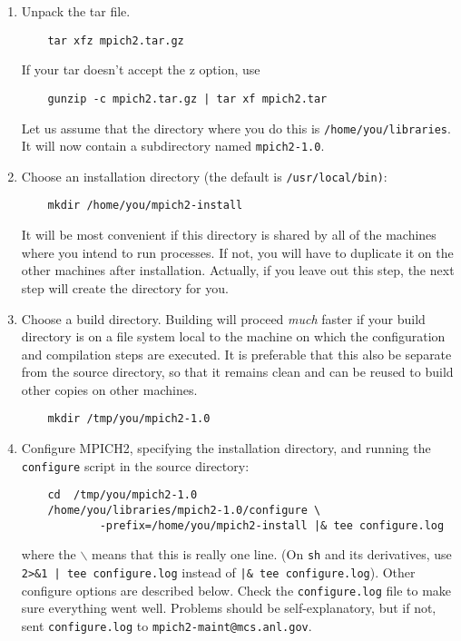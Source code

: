 \documentclass[dvipdfm,11pt]{article}
\begin{document}
\begin{enumerate}
\item 
Unpack the tar file.
\begin{verbatim}
    tar xfz mpich2.tar.gz
\end{verbatim}
If your tar doesn't accept the z option, use
\begin{verbatim}
    gunzip -c mpich2.tar.gz | tar xf mpich2.tar
\end{verbatim}
Let us assume that the directory where you do this is
\texttt{/home/you/libraries}.  It will now contain a subdirectory named
\texttt{mpich2-1.0}.

\item
Choose an installation directory (the default is \texttt{/usr/local/bin)}:
\begin{verbatim}
    mkdir /home/you/mpich2-install
\end{verbatim}
It will be most convenient if this directory is shared by all of the
machines where you intend to run processes.  If not, you will have
to duplicate it on the other machines after installation.  Actually, if
you leave out this step, the next step will create the directory for you.

\item
Choose a build directory.  Building will proceed \emph{much} faster if
your build directory is on a file system local to the machine on which
the configuration and compilation steps are executed.  It is preferable
that this also be separate from the source directory, so that it remains
clean and can be reused to build other copies on other machines.
\begin{verbatim}
    mkdir /tmp/you/mpich2-1.0
\end{verbatim}

\item
Configure MPICH2, specifying the installation directory, and running
the \texttt{configure} script in the source directory:
\begin{verbatim}
    cd  /tmp/you/mpich2-1.0
    /home/you/libraries/mpich2-1.0/configure \
            -prefix=/home/you/mpich2-install |& tee configure.log
\end{verbatim}
where the \texttt{$\backslash$} means that this is really one line.  (On
\texttt{sh} and its derivatives, use \verb+2>&1 | tee configure.log+
instead of \verb+|& tee configure.log+).  Other configure options are
described below.  Check the \texttt{configure.log} file to make sure
everything went well.  Problems should be self-explanatory, but if not,
sent \texttt{configure.log} to \texttt{mpich2-maint@mcs.anl.gov}.


\end{enumerate}
\end{document}
